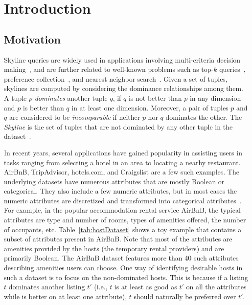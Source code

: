 \section{Introduction}\label{sec:inro}
\subsection{Motivation}
\label{sec:motivation}
Skyline queries are widely used in applications involving multi-criteria decision making~\cite{hwang2012multiple}, and are further related to well-known problems such as top-$k$ queries~\cite{ilyas2008survey}, preference collection~\cite{asudeh2015crowdsourcing}, and nearest neighbor search~\cite{kossmann2002}.
Given a set of tuples, skylines are computed by considering the dominance relationships among them. A tuple $p$ \textit{dominates} another tuple $q$, if $q$ is not better than $p$ in any dimension and $p$ is better than $q$ in at least one dimension. Moreover, a pair of tuples $p$ and $q$ are considered to be \textit{incomparable} if neither $p$ nor $q$ dominates the other. The {\em Skyline} is the set of tuples that are not dominated by any other tuple in the dataset~\cite{borzsony2001skyline}.

In recent years, several applications have gained popularity in assisting users in tasks ranging from selecting a hotel in an area to locating a nearby restaurant. AirBnB, TripAdvisor, hotels.com, and Craigslist are a few such examples. The underlying datasets have numerous attributes that are mostly Boolean or categorical. 
They also include a few numeric attributes, but in most cases the numeric attributes are discretized and transformed into categorical attributes~\cite{morse2007efficient}.
For example, in the popular accommodation rental service AirBnB, the typical attributes are type and number of rooms, types of amenities offered, the number of occupants, etc. Table~\ref{tab:hostDataset} shows a toy example that contains a subset of attributes present in AirBnB. Note that most of the attributes are amenities provided by the hosts (the temporary rental providers) and are primarily Boolean. The AirBnB dataset features more than 40 such attributes describing amenities users can choose. One way of identifying desirable hosts in such a dataset is to focus on the non-dominated hosts. This is because if a listing $t$ dominates another listing $t'$ (i.e., $t$ is at least as good as $t'$ on all the attributes while is better on at least one attribute), $t$ should naturally be preferred over $t'$.

